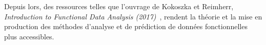 {    \bigskip

    Depuis lors, des ressources telles que l'ouvrage de Kokoszka et Reimherr, \emph{\textcolor{flatuicolors_blue_devil}{Introduction to Functional Data Analysis (2017)}}~\cite{kokoszka2017introduction}, rendent la théorie et la mise en production des méthodes d'analyse et de prédiction de données fonctionnelles plus accessibles.
}
